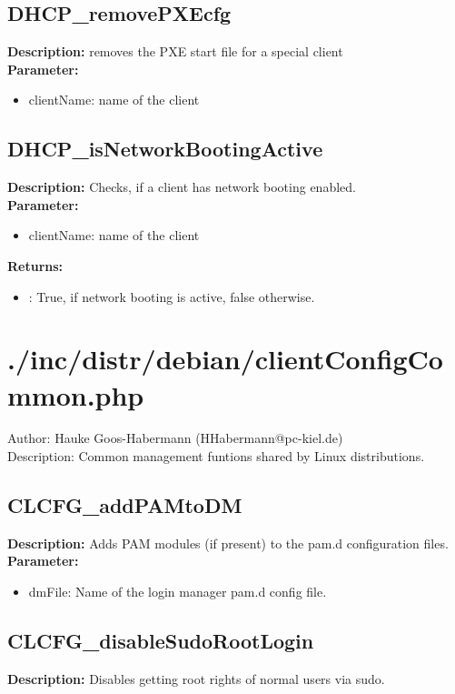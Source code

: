 \subsection{DHCP\_removePXEcfg}
\textbf{Description:} removes the PXE start file for a special client\\
\textbf{Parameter:}
\begin{itemize}
\item clientName: name of the client
\end{itemize}

\subsection{DHCP\_isNetworkBootingActive}
\textbf{Description:} Checks, if a client has network booting enabled.\\
\textbf{Parameter:}
\begin{itemize}
\item clientName: name of the client
\end{itemize}
\textbf{Returns:}
\begin{itemize}
\item : True, if network booting is active, false otherwise.
\end{itemize}

\newpage\section{./inc/distr/debian/clientConfigCommon.php}
 Author: Hauke Goos-Habermann (HHabermann@pc-kiel.de)\\
 Description: Common management funtions shared by Linux distributions.\\

\subsection{CLCFG\_addPAMtoDM}
\textbf{Description:} Adds PAM modules (if present) to the pam.d configuration files.\\
\textbf{Parameter:}
\begin{itemize}
\item dmFile: Name of the login manager pam.d config file.
\end{itemize}

\subsection{CLCFG\_disableSudoRootLogin}
\textbf{Description:} Disables getting root rights of normal users via sudo.\\

